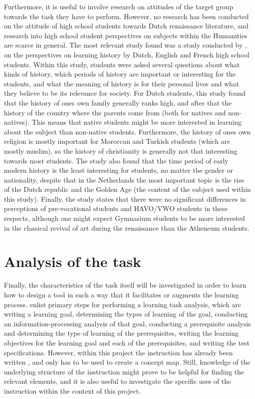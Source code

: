 Furthermore, it is useful to involve research on attitudes of the target group towards the task they have to perform. However, no research has been conducted on the attitude of high school students towards Dutch renaissance literature, and research into high school student perspectives on subjects within the Humanities are scarce in general. The most relevant study found was a study conducted by , on the perspectives on learning history by Dutch, English and French high school students. Within this study, students were asked several questions about what kinds of history, which periods of history are important or interesting for the students, and what the meaning of history is for their personal lives and what they believe to be its relevance for society. For Dutch students, this study found that the history of ones own family generally ranks high, and after that the history of the country where the parents come from (both for natives and non-natives). This means that native students might be more interested in learning about the subject than non-native students. Furthermore, the history of ones own religion is mostly important for Moroccan and Turkish students (which are mostly muslim), so the history of christianity is generally not that interesting towards most students. The study also found that the time period of early modern history is the least interesting for students, no matter the gender or nationality, despite that in the Netherlands the most important topic is the rise of the Dutch republic and the Golden Age (the content of the subject used within this study). Finally, the study states that there were no significant differences in perceptions of pre-vocational students and HAVO/VWO students in these respects, although one might expect Gymnasium students to be more interested in the classical revival of art during the renaissance than the Atheneum students.

\section{Analysis of the task}

Finally, the characteristics of the task itself will be investigated in order to learn how to design a tool in such a way that it facilitates or augments the learning process.  enlist primary steps for performing a learning task analysis, which are writing a learning goal, determining the types of learning of the goal, conducting an information-processing analysis of that goal, conducting a prerequisite analysis and determining the type of learning of the prerequisites, writing the learning objectives for the learning goal and each of the prerequisites, and writing the test specifications. However, within this project the instruction has already been written \cite{laagland}, and only has to be used to create a concept map. Still, knowledge of the underlying structure of the instruction might prove to be helpful for finding the relevant elements, and it is also useful to investigate the specific uses of the instruction within the context of this project.

